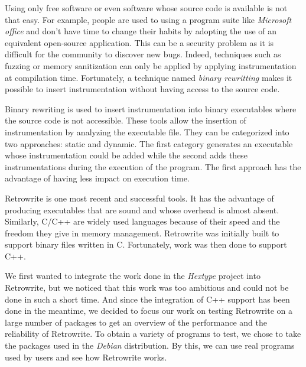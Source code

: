\documentclass[a4paper,11pt,oneside]{report}
\newcommand{\sysname}{Retrowrite\xspace}
\begin{document}
%
Using only free software or even software whose source code is available is
not that easy. For example, people are used to using a program suite like
\textit{Microsoft office} and don't have time to change their habits by adopting
the use of an equivalent open-source application.  This can be a security
problem as it is difficult for the community to discover new bugs. Indeed,
techniques such as fuzzing or memory sanitization can only be applied by
applying instrumentation at compilation time. Fortunately, a technique named
\textit{binary rewritting} makes it possible to insert instrumentation without
having access to the source code.


Binary rewriting is used to insert instrumentation into
binary executables where the source code is not accessible. These tools allow
the insertion of instrumentation by analyzing the executable file. They can be
categorized into two approaches: static and dynamic. The first category
generates an executable whose instrumentation could be added while the second
adds these instrumentations during the execution of the program. The first
approach has the advantage of having less impact on execution time. 

\sysname is one most recent and successful tools. It has the advantage of
producing executables that are sound and whose overhead is almost absent.
Similarly, C/C++ are widely used languages because of their speed and the
freedom they give in memory management. Retrowrite was initially built to
support binary files written in C. Fortunately, work was then done to support
C++.


We first wanted to integrate the work done in the \textit{Hextype} project into
\sysname, but we noticed that this work was too ambitious and could not be done in
such a short time. And since the integration of C++ support has been done in
the meantime, we decided to focus our work on testing \sysname on a large
number of packages to get an overview of the performance and the
reliability of \sysname. To obtain a variety of programs to test, we chose to
take the packages used in the \textit{Debian} distribution. By this, we can use
real programs used by users and see how \sysname works.
\end{document}
